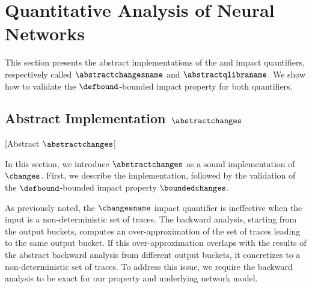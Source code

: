 


\section{Quantitative Analysis of Neural Networks}


This section presents the abstract implementations of the \changesname{} and \qlibraname{} impact quantifiers, respectively called $\abstractchangesname$ and $\abstractqlibraname$.
We show how to validate the $\defbound$-bounded impact property for both quantifiers.


\subsection{Abstract Implementation \texorpdfstring{$\abstractchanges$}{Abstract Changes}}[Abstract \texorpdfstring{$\abstractchanges$}{Changes}]

In this section, we introduce $\abstractchanges$ as a sound implementation of $\changes$.
First, we describe the implementation, followed by the validation of the $\defbound$-bounded impact property $\boundedchanges$.


As previously noted, the $\changesname$ impact quantifier is ineffective when the input is a non-deterministic set of traces.
The backward analysis, starting from the output buckets, computes an over-approximation of the set of traces leading to the same output bucket.
If this over-approximation overlaps with the results of the abstract backward analysis from different output buckets, it concretizes to a non-deterministic set of traces.
To address this issue, we require the backward analysis to be exact for our property and underlying network model.

